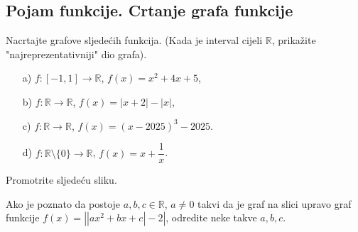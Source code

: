 \subsection*{Pojam funkcije. Crtanje grafa funkcije}
\begin{exercise}
Nacrtajte grafove sljedećih funkcija. (Kada je interval cijeli $\mathbb{R}$, prikažite "najreprezentativniji" dio grafa). 
\begin{itemize}
\item[a)] $f : [-1, 1]\to \mathbb{R}$, $f(x)=x^2+4x+5$,
\item[b)] $f : \mathbb{R}\to \mathbb{R}$, $f(x)=|x+2|-|x|$,
\item[c)] $f : \mathbb{R}\to \mathbb{R}$, $f(x)=(x-2025)^3-2025$.
\item[d)] $f : \mathbb{R}\setminus\{0\}\to \mathbb{R}$, $f(x)=x+\dfrac{1}{x}$.
\end{itemize}
\end{exercise}
\begin{exercise} Promotrite sljedeću sliku.
\begin{figure}[ht]
\begin{center}
\end{center}
\end{figure}

Ako je poznato da postoje $a, b, c\in \mathbb{R}$, $a\neq 0$ takvi da je graf na slici upravo graf funkcije $f(x)=\left|\left|ax^2+bx+c\right|-2\right|$, odredite neke takve $a, b, c$.
\end{exercise}
